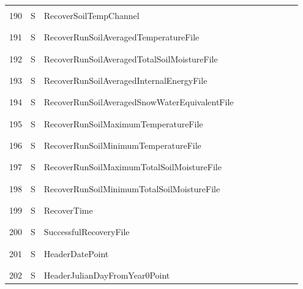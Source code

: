 \begin{longtable}{|c|c|l|c|c|c|c|p{}|c|p{}|}
&&&&&&&&&\\
190 & S & RecoverSoilTempChannel & & & & & & & \\
&&&&&&&&&\\\hline%
&&&&&&&&&\\
191 & S & RecoverRunSoilAveragedTemperatureFile & & & & & & & \\
&&&&&&&&&\\\hline%
&&&&&&&&&\\
192 & S & RecoverRunSoilAveragedTotalSoilMoistureFile & & & & & & & \\
&&&&&&&&&\\\hline%
&&&&&&&&&\\
193 & S & RecoverRunSoilAveragedInternalEnergyFile & & & & & & & \\
&&&&&&&&&\\\hline%
&&&&&&&&&\\
194 & S & RecoverRunSoilAveragedSnowWaterEquivalentFile & & & & & & & \\
&&&&&&&&&\\\hline%
&&&&&&&&&\\
195 & S & RecoverRunSoilMaximumTemperatureFile & & & & & & & \\
&&&&&&&&&\\\hline%
&&&&&&&&&\\
196 & S & RecoverRunSoilMinimumTemperatureFile & & & & & & & \\
&&&&&&&&&\\\hline%
&&&&&&&&&\\
197 & S & RecoverRunSoilMaximumTotalSoilMoistureFile & & & & & & & \\
&&&&&&&&&\\\hline%
&&&&&&&&&\\
198 & S & RecoverRunSoilMinimumTotalSoilMoistureFile & & & & & & & \\
&&&&&&&&&\\\hline%
&&&&&&&&&\\
199 & S & RecoverTime & & & & & & & \\
&&&&&&&&&\\\hline%
&&&&&&&&&\\
200 & S & SuccessfulRecoveryFile & & & & & & & \\
&&&&&&&&&\\\hline%
&&&&&&&&&\\
201 & S & HeaderDatePoint & & & & & & & \\
&&&&&&&&&\\\hline%
&&&&&&&&&\\
202 & S & HeaderJulianDayFromYear0Point & & & & & & & \\

\end{longtable}

